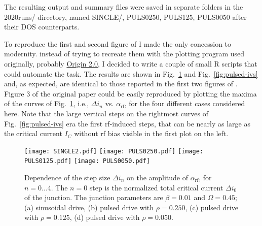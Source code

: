 The resulting output and summary files were saved in separate folders in the \textsf{2020runs/} directory, named \textsf{SINGLE/}, \textsf{PULS0250}, \textsf{PULS125}, \textsf{PULS0050} after their DOS counterparts.

To reproduce the first and second figure of \cite{Maggi:1996} I made the only concession to modernity. instead of trying to recreate them with the plotting program used originally, probably \href{https://www.originlab.com}{Origin 2.0}, I decided to write a couple of small R scripts that could automate the task.
The results are shown in Fig.~\ref{fig:step-width} and Fig.~\ref{fig:pulsed-ivs} and, as expected, are identical to those reported in the first two figures of \cite{Maggi:1996}. 
Figure 3 of the original paper could be easily reproduced by plotting the maxima of the curves of Fig.~\ref{fig:step-width}, i.e., $\Delta i_n$ vs. $\alpha_\mathrm{rf}$, for the four different cases considered here.
Note that the large vertical steps on the rightmost curves of Fig.~\ref{fig:pulsed-ivs} era the first rf-induced steps, that can be nearly as large as the critical current $I_C$ without rf bias visible in the first plot on the left.

\begin{figure}[tbh]
	\centering
	\texttt{[image: SINGLE2.pdf]}
	\texttt{[image: PULS0250.pdf]}
	\texttt{[image: PULS0125.pdf]}
	\texttt{[image: PULS0050.pdf]}
	\caption{Dependence of the step size $\Delta i_n$ on the amplitude of  $\alpha_\mathrm{rf}$, for $n = 0. . . 4$. The $n = 0$ step is the normalized total critical current $\Delta i_0$ of the junction. The junction parameters are $\beta = 0. 01$ and $\Omega = 0. 45$; (a) sinusoidal drive, (b) pulsed drive with $\rho = 0. 250$, (c) pulsed drive with $\rho = 0. 125$, (d) pulsed drive with $\rho = 0. 050$.}
	\label{fig:step-width}
\end{figure}


